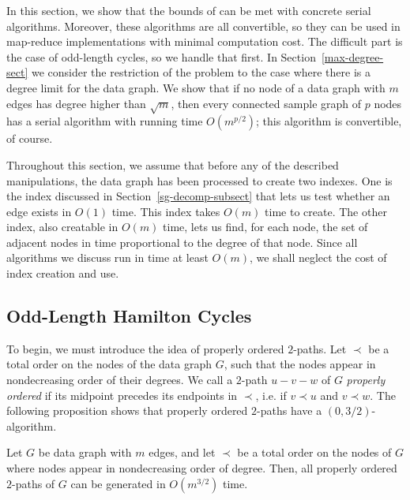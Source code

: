 In this section, we show that the bounds of \cite{Alon81} can be met with concrete serial algorithms.  Moreover, these algorithms are all convertible, so they can be used in map-reduce implementations with minimal computation cost.  The difficult part is the case of odd-length cycles, so we handle that first.
In Section~\ref{max-degree-sect}  we consider the restriction of the problem to the case where there is a degree limit for the data graph.  We show that if no node of a data graph with $m$ edges has degree higher than $\sqrt{m}$, then every connected sample graph of $p$ nodes has a serial algorithm with running time $O(m^{p/2})$; this algorithm is convertible, of course.

Throughout this section, we assume that before any of the described manipulations, the data graph has been processed to create two indexes.  One is the index discussed in Section~\ref{sg-decomp-subsect} that lets us test whether an edge exists in $O(1)$ time. This index takes $O(m)$ time to create.
The other index, also creatable in $O(m)$ time, lets us find, for each node, the set of adjacent nodes in time proportional to the degree of that node.
Since all algorithms we discuss run in time at least $O(m)$, we shall neglect the cost of index creation and use.

\subsection{Odd-Length Hamilton Cycles}
\label{odd-cycle-subsect}

To begin, we must introduce the idea of properly ordered $2$-paths. Let $\prec$ be a total order on the nodes of the data graph $G$, such that the nodes appear in nondecreasing order of their degrees. We call a $2$-path $u - v - w$ of $G$ \emph{properly ordered} if its midpoint precedes its endpoints in $\prec$, i.e. if $v \prec u$ and $v \prec w$. The following proposition shows that properly ordered $2$-paths have a $(0, 3/2)$-algorithm.

\begin{lemma}\label{pr:2-paths}
Let $G$ be data graph with $m$ edges, and let $\prec$ be a total order on the nodes of $G$ where nodes appear in nondecreasing order of degree. Then, all properly ordered $2$-paths of $G$ can be generated in $O(m^{3/2})$ time.
\end{lemma}

